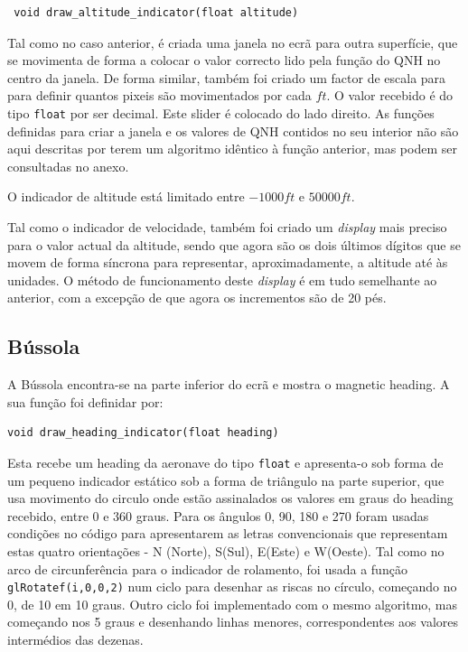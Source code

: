 \documentclass[palatino]{ist-report}
\begin{document}
\begin{verbatim}
 void draw_altitude_indicator(float altitude)
\end{verbatim}

Tal como no caso anterior, é criada uma janela no ecrã para outra superfície, que se movimenta de forma a colocar o valor correcto lido pela função do QNH no centro da janela. De forma similar, também foi criado um factor de escala para para definir quantos pixeis são movimentados por cada $ft$. O valor recebido é do tipo \texttt{float} por ser decimal. Este slider é colocado do lado direito. As funções definidas para criar a janela e os valores de QNH contidos no seu interior não são aqui descritas por terem um algoritmo idêntico à função anterior, mas podem ser consultadas no anexo. 

O indicador de altitude está limitado entre $-1000ft$ e $50000ft$.

Tal como o indicador de velocidade, também foi criado um \textit{display} mais preciso para o valor actual da altitude, sendo que agora são os dois últimos dígitos que se movem de forma síncrona para representar, aproximadamente, a altitude até às unidades. O método de funcionamento deste \textit{display} é em tudo semelhante ao anterior, com a excepção de que agora os incrementos são de 20 pés.


\subsection{Bússola}

A Bússola encontra-se na parte inferior do ecrã e mostra o magnetic heading. A sua função foi definidar por: 

\begin{verbatim}
void draw_heading_indicator(float heading) 
\end{verbatim}

Esta recebe um heading da aeronave do tipo \texttt{float} e apresenta-o sob forma de um pequeno indicador estático sob a forma de triângulo na parte superior, que usa movimento do circulo onde estão assinalados os valores em graus do heading recebido, entre 0 e 360 graus. Para os ângulos 0, 90, 180 e 270 foram usadas condições no código para apresentarem as letras convencionais que representam estas quatro orientações - N (Norte), S(Sul), E(Este) e W(Oeste). Tal como no arco de circunferência para o indicador de rolamento, foi usada a função \texttt{glRotatef(i,0,0,2)} num ciclo para desenhar as riscas no círculo, começando no 0, de 10 em 10 graus. Outro ciclo foi implementado com o mesmo algoritmo, mas começando nos 5 graus e desenhando linhas menores, correspondentes aos valores intermédios das dezenas. 
\end{document}
